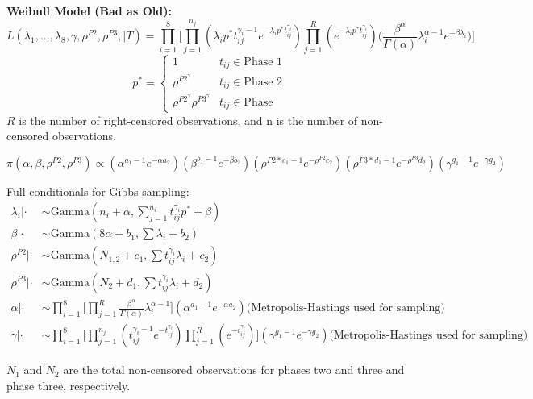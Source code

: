 \documentclass[12pt]{article}
\begin{document}
\textbf{Weibull Model (Bad as Old):}
\begin{equation*}
  L(\lambda_1, ..., \lambda_8, \gamma, \rho^{P2}, \rho^{P3}, \vert T) = \prod_{i =
    1}^8 \Bigg[\prod_{j = 1}^{n_j}(\lambda_i p^*t_{ij}^{\gamma_i-1} e^{-\lambda_i
    p^* t_{ij}^{\gamma_i}})\prod_{j = 1}^R(e^{-\lambda_i p^*
    t_{ij}^{\gamma_i}})\Big(\frac{\beta^\alpha}{\Gamma(\alpha)}\lambda_i^{\alpha -
    1}e^{-\beta\lambda_i}\Big)\Bigg]
\end{equation*}
\[p^* =   \left\{
\begin{array}{ll}
      1 & t_{ij}\in \text{Phase 1} \\
      \rho^{P2^\gamma} & t_{ij} \in \text{Phase 2} \\
      \rho^{P2^\gamma} \rho^{P3^\gamma} & t_{ij} \in \text{Phase }
\end{array}
\right. \]
$R$ is the number of right-censored observations, and n is the number of
non-censored observations.

\begin{equation*}
\pi(\alpha, \beta, \rho^{P2}, \rho^{P3}) \propto (\alpha^{a_1-1}e^{-\alpha
  a_2})(\beta^{b_1 - 1}e^{-\beta b_2})(\rho^{P2*c_1 - 1}e^{-\rho^{P2}
  c_2})(\rho^{P3 * d_1 - 1}e^{-\rho^{P3} d_2})(\gamma^{g_1 - 1}e^{-\gamma g_2})
\end{equation*}

Full conditionals for Gibbs sampling:
\begin{align*}
\lambda_i|\cdot &\sim \text{Gamma}(n_i + \alpha, \sum_{j=1}^{n_i}t_{ij}^{\gamma_i} p^* + \beta) \\
\beta|\cdot &\sim \text{Gamma}(8\alpha + b_1, \sum{\lambda_i} + b_2) \\
\rho^{P2}|\cdot &\sim \text{Gamma}(N_{1,2} + c_1, \sum{t_{ij}^{\gamma_i} \lambda_i} + c_2) \\
\rho^{P3}|\cdot &\sim \text{Gamma}(N_{2} + d_1, \sum{t_{ij}^{\gamma_i} \lambda_i} + d_2) \\
\alpha|\cdot &\sim \prod_{i = 1}^8 \Bigg[\prod_{j =1}^R \frac{\beta^\alpha}{\Gamma(\alpha)}\lambda_i^{\alpha -
  1}\Bigg] (\alpha^{a_1-1}e^{-\alpha a_2}) \text{(Metropolis-Hastings used for sampling)}\\
\gamma|\cdot &\sim \prod_{i = 1}^8 \Bigg[ \prod_{j = 1}^{n_j}(t_{ij}^{\gamma_i-1} e^{-t_{ij}^{\gamma_i}})\prod_{j = 1}^R(e^{-t_{ij}^{\gamma_i}}) \Bigg] (\gamma^{g_1 - 1}e^{-\gamma g_2}) \text{(Metropolis-Hastings used for sampling)}
\end{align*}

$N_1$ and $N_2$ are the total non-censored observations for phases two and three
and phase three, respectively.
\end{document}
